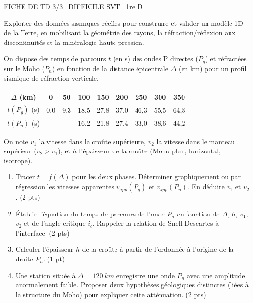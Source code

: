 \documentclass[11pt]{article}
\begin{document}
\begin{tcolorbox}[enhanced,colback=popink,colframe=popink,arc=10pt,boxrule=0pt,left=12pt,right=12pt,top=9pt,bottom=9pt]
{\color{white}\popxbold\small FICHE DE TD 3/3 \textbullet\ DIFFICILE \hfill SVT \textbullet\ 1re D\par}
\end{tcolorbox}
\vspace{4pt}
\noindent Exploiter des données sismiques réelles pour construire et valider un modèle 1D de la Terre, en mobilisant la géométrie des rayons, la réfraction/réflexion aux discontinuités et la minéralogie haute pression.

\begin{exercice}
On dispose des temps de parcours $t$ (en s) des ondes P directes ($P_g$) et réfractées sur le Moho ($P_n$) en fonction de la distance épicentrale $\Delta$ (en km) pour un profil sismique de réfraction verticale.

\begin{center}
\begin{tabular}{c|cccccccc}
$\Delta$ (km) & 0 & 50 & 100 & 150 & 200 & 250 & 300 & 350 \\
\hline
$t(P_g)$ (s) & 0,0 & 9,3 & 18,5 & 27,8 & 37,0 & 46,3 & 55,5 & 64,8 \\
$t(P_n)$ (s) & -- & -- & 16,2 & 21,8 & 27,4 & 33,0 & 38,6 & 44,2 \\
\end{tabular}
\end{center}

On note $v_1$ la vitesse dans la croûte supérieure, $v_2$ la vitesse dans le manteau supérieur ($v_2 > v_1$), et $h$ l'épaisseur de la croûte (Moho plan, horizontal, isotrope).

\begin{enumerate}
    \item Tracer $t = f(\Delta)$ pour les deux phases. Déterminer graphiquement ou par régression les vitesses apparentes $v_{app}(P_g)$ et $v_{app}(P_n)$. En déduire $v_1$ et $v_2$. (2 pts)
    \item Établir l'équation du temps de parcours de l'onde $P_n$ en fonction de $\Delta$, $h$, $v_1$, $v_2$ et de l'angle critique $i_c$. Rappeler la relation de Snell-Descartes à l'interface. (2 pts)
    \item Calculer l'épaisseur $h$ de la croûte à partir de l'ordonnée à l'origine de la droite $P_n$. (1 pt)
    \item Une station située à $\Delta = \SI{120}{km}$ enregistre une onde $P_n$ avec une amplitude anormalement faible. Proposer deux hypothèses géologiques distinctes (liées à la structure du Moho) pour expliquer cette atténuation. (2 pts)
\end{enumerate}
\end{exercice}
\end{document}
